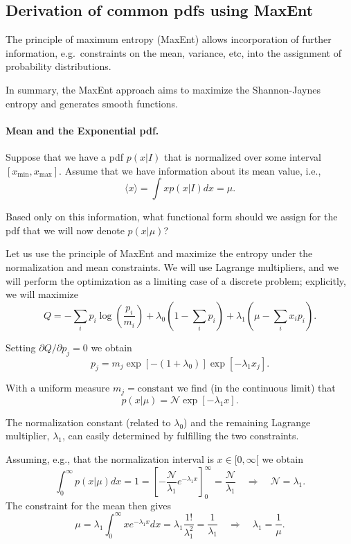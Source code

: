 \documentclass[%
oneside,                 %
final,                   %
10pt]{article}
\begin{document}
\noindent
\subsection{Derivation of common pdfs using MaxEnt}

The principle of maximum entropy (MaxEnt) allows incorporation of further information, e.g.~constraints on the mean, variance, etc, into the assignment of probability distributions.

In summary, the MaxEnt approach aims to maximize the Shannon-Jaynes entropy and generates smooth functions.

\paragraph{Mean and the Exponential pdf.}
Suppose that we have a pdf $p(x|I)$ that is normalized over some interval $[ x_\mathrm{min}, x_\mathrm{max}]$. Assume that we have information about its mean value, i.e.,
\[
\langle x \rangle = \int x p(x|I) dx = \mu.
\]

Based only on this information, what functional form should we assign for the pdf that we will now denote $p(x|\mu)$? 

Let us use the principle of MaxEnt and maximize the entropy under the normalization and mean constraints. We will use Lagrange multipliers, and we will perform the optimization as a limiting case of a discrete problem; explicitly, we will maximize
\[
Q = -\sum_i p_i \log \left( \frac{p_i}{m_i} \right) + \lambda_0 \left( 1 - \sum_i p_i \right) + \lambda_1 \left( \mu - \sum_i x_i p_i \right).
\]

Setting $\partial Q / \partial p_j = 0$ we obtain
\[
p_j = m_j \exp \left[ -(1+\lambda_0) \right] \exp \left[ -\lambda_1 x_j \right].
\]

With a uniform measure $m_j = \mathrm{constant}$ we find (in the continuous limit) that
\[
p(x|\mu) = \mathcal{N} \exp \left[ -\lambda_1 x \right].
\]

The normalization constant (related to $\lambda_0$) and the remaining Lagrange multiplier, $\lambda_1$, can easily determined by fulfilling the two constraints. 

Assuming, e.g., that the normalization interval is $x \in [0, \infty[$ we obtain
\[
\int_0^\infty p(x|\mu) dx = 1 = \left[ -\frac{\mathcal{N}}{\lambda_1} e^{-\lambda_1 x} \right]_0^\infty = \frac{\mathcal{N}}{\lambda_1} \quad \Rightarrow \quad \mathcal{N} = \lambda_1.
\]
The constraint for the mean then gives
\[
\mu = \lambda_1 \int_0^\infty x  e^{-\lambda_1 x} dx = \lambda_1 \frac{1!}{\lambda_1^2}
= \frac{1}{\lambda_1}
\quad \Rightarrow \quad \lambda_1 = \frac{1}{\mu}.
\]
\end{document}
